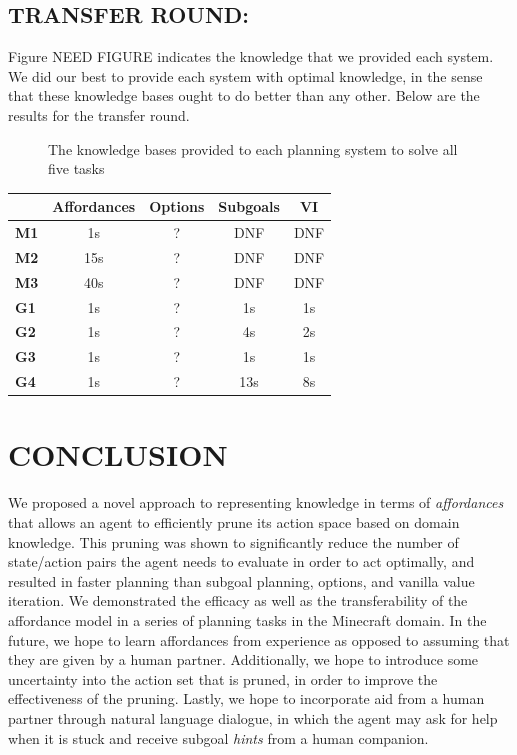 \documentclass[]{article}
\begin{document}
\subsection{TRANSFER ROUND:}

Figure NEED FIGURE indicates the knowledge that we provided each system. We did our best to provide each system with optimal knowledge, in the sense that these knowledge bases ought to do better than any other. Below are the results for the transfer round.

\begin{figure}
\centering
{}
\caption{The knowledge bases provided to each planning system to solve all five tasks \label{tbl:transfer_kb}}
\end{figure}


\begin{tabular}{ l || c | c | c | c }
  & Affordances & Options & Subgoals & VI \\
  \hline
  {\bf M1} & 1s & ? & DNF & DNF  \\
  {\bf M2} & 15s & ? & DNF & DNF \\
  {\bf M3} & 40s & ? & DNF & DNF \\
  {\bf G1} & 1s & ? & 1s & 1s \\
  {\bf G2} & 1s & ? & 4s & 2s \\
  {\bf G3} & 1s & ? & 1s & 1s \\
  {\bf G4} & 1s & ? & 13s & 8s \\
\end{tabular}


\section{CONCLUSION}

We proposed a novel approach to representing
knowledge in terms of {\em
  affordances}~\citep{gibson77} that allows an agent to efficiently prune its
action space based on domain knowledge. This pruning was shown to significantly
reduce the number of state/action pairs the agent needs to evaluate
in order to act optimally, and resulted in faster planning than subgoal planning, options,
and vanilla value iteration. We demonstrated the efficacy as well as the 
transferability of the affordance model in a series of planning tasks in the Minecraft domain.
In the future, we hope to learn affordances from experience as opposed to assuming
that they are given by a human partner. Additionally, we hope to introduce some uncertainty
into the action set that is pruned, in order to improve the effectiveness of the pruning. Lastly,
we hope to incorporate aid from a human partner through natural language dialogue, in which
the agent may ask for help when it is stuck and receive subgoal {\it hints} from a human
companion.


  
\end{document}
